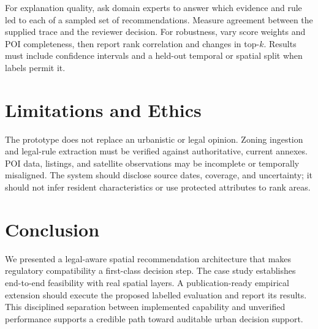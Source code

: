 \documentclass[conference]{IEEEtran}
\begin{document}
For explanation quality, ask domain experts to answer which evidence and rule led to each of a sampled set of recommendations. Measure agreement between the supplied trace and the reviewer decision. For robustness, vary score weights and POI completeness, then report rank correlation and changes in top-$k$. Results must include confidence intervals and a held-out temporal or spatial split when labels permit it.

\section{Limitations and Ethics}
The prototype does not replace an urbanistic or legal opinion. Zoning ingestion and legal-rule extraction must be verified against authoritative, current annexes. POI data, listings, and satellite observations may be incomplete or temporally misaligned. The system should disclose source dates, coverage, and uncertainty; it should not infer resident characteristics or use protected attributes to rank areas.

\section{Conclusion}
We presented a legal-aware spatial recommendation architecture that makes regulatory compatibility a first-class decision step. The case study establishes end-to-end feasibility with real spatial layers. A publication-ready empirical extension should execute the proposed labelled evaluation and report its results. This disciplined separation between implemented capability and unverified performance supports a credible path toward auditable urban decision support.



\end{document}
